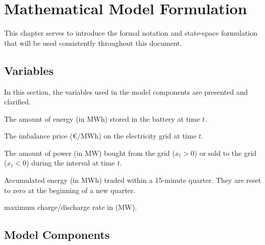 \chapter{Mathematical Model Formulation}
\label{chap:3}

This chapter serves to introduce the formal notation and state-space formulation that will be used consistently throughout this document.
\section{Variables}
\label{sec:1}
In this section, the variables used in the model components are presented and clarified.

\begin{description}[align=left, labelwidth=3cm, leftmargin=!]
    \item[\( SoC_t \)] The amount of energy (in MWh) stored in the battery at time \( t \).
    \item[\( p_t \)] The imbalance price (€/MWh) on the electricity grid at time \( t \).
    \item[\( x_t \)] The amount of power (in MW) bought from the grid (\( x_t > 0 \)) or sold to the grid (\( x_t < 0 \)) during the interval at time \( t \).
    \item[\(A^{c}_{t}, A^d_t\)] Accumulated energy (in MWh) traded within a 15-minute quarter. They are reset to zero at the beginning of a new quarter.
    \item[\(r^{chg}, r^{dis}\)] maximum charge/discharge rate in (MW).
\end{description}

\section{Model Components}

